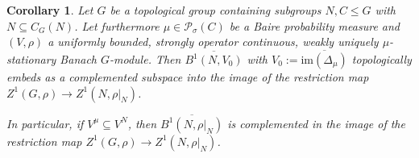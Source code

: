 \documentclass[a4paper,11pt,reqno]{amsart}
\numberwithin{equation}{section}
\newtheorem{corollary}[theorem]{Corollary}
\theoremstyle{definition}
\theoremstyle{remark}
\theoremstyle{remark}
\begin{document}
\begin{corollary} \label{ComplementedCorollary} Let $G$ be a topological group containing subgroups $N,C\leq G$ with $N\subseteq C_{G}(N)$. Let furthermore $\mu\in\mathcal{P}_{\sigma}(C)$ be a Baire probability measure and $(V,\rho)$ a uniformly bounded, strongly operator continuous, weakly uniquely $\mu$-stationary Banach $G$-module. Then $\overline{B^{1}(N,V_{0})}$ with \emph{$V_{0}:=\overline{\text{im}(\Delta_{\mu})}$} topologically embeds as a complemented subspace into the image of the restriction map $Z^{1}(G,\rho)\rightarrow Z^{1}(N,\rho|_{N})$.

In particular, if $V^{\mu}\subseteq V^{N}$, then $\overline{B^{1}(N,\rho|_{N})}$ is complemented in the image of the restriction map $Z^{1}(G,\rho)\rightarrow Z^{1}(N,\rho|_{N})$. \end{corollary}
\end{document}
